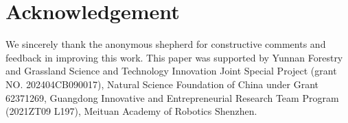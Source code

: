 \section{Acknowledgement}
We sincerely thank the anonymous shepherd for constructive comments and feedback in improving this work. 
This paper was supported by Yunnan Forestry and Grassland Science and Technology Innovation Joint Special Project (grant NO. 202404CB090017), Natural Science Foundation of China under Grant 62371269, Guangdong Innovative and Entrepreneurial Research Team Program (2021ZT09 L197), Meituan Academy of Robotics Shenzhen.
